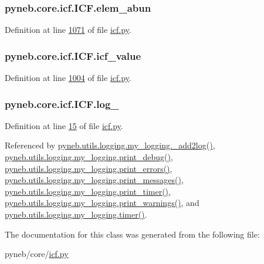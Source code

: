 \hypertarget{classpyneb_1_1core_1_1icf_1_1_i_c_f_a59ea6760bd6a09a66dc47b47bcec55c0}{}
\subsubsection[{elem\+\_\+abun}]{\setlength{\rightskip}{0pt plus 5cm}pyneb.\+core.\+icf.\+I\+C\+F.\+elem\+\_\+abun}\label{classpyneb_1_1core_1_1icf_1_1_i_c_f_a59ea6760bd6a09a66dc47b47bcec55c0}


Definition at line \hyperlink{icf_8py_source_l01071}{1071} of file \hyperlink{icf_8py_source}{icf.\+py}.

\hypertarget{classpyneb_1_1core_1_1icf_1_1_i_c_f_a9dedc0eb2ad90ea08b8be9984e2d832b}{}
\subsubsection[{icf\+\_\+value}]{\setlength{\rightskip}{0pt plus 5cm}pyneb.\+core.\+icf.\+I\+C\+F.\+icf\+\_\+value}\label{classpyneb_1_1core_1_1icf_1_1_i_c_f_a9dedc0eb2ad90ea08b8be9984e2d832b}


Definition at line \hyperlink{icf_8py_source_l01004}{1004} of file \hyperlink{icf_8py_source}{icf.\+py}.

\hypertarget{classpyneb_1_1core_1_1icf_1_1_i_c_f_a50ae74d7192ec52a1249a675f963461e}{}
\subsubsection[{log\+\_\+}]{\setlength{\rightskip}{0pt plus 5cm}pyneb.\+core.\+icf.\+I\+C\+F.\+log\+\_\+}\label{classpyneb_1_1core_1_1icf_1_1_i_c_f_a50ae74d7192ec52a1249a675f963461e}


Definition at line \hyperlink{icf_8py_source_l00015}{15} of file \hyperlink{icf_8py_source}{icf.\+py}.



Referenced by \hyperlink{logging_8py_source_l00059}{pyneb.\+utils.\+logging.\+my\+\_\+logging.\+\_\+add2log()}, \hyperlink{logging_8py_source_l00157}{pyneb.\+utils.\+logging.\+my\+\_\+logging.\+print\+\_\+debug()}, \hyperlink{logging_8py_source_l00149}{pyneb.\+utils.\+logging.\+my\+\_\+logging.\+print\+\_\+errors()}, \hyperlink{logging_8py_source_l00133}{pyneb.\+utils.\+logging.\+my\+\_\+logging.\+print\+\_\+messages()}, \hyperlink{logging_8py_source_l00165}{pyneb.\+utils.\+logging.\+my\+\_\+logging.\+print\+\_\+timer()}, \hyperlink{logging_8py_source_l00141}{pyneb.\+utils.\+logging.\+my\+\_\+logging.\+print\+\_\+warnings()}, and \hyperlink{logging_8py_source_l00115}{pyneb.\+utils.\+logging.\+my\+\_\+logging.\+timer()}.



The documentation for this class was generated from the following file\+:\begin{DoxyCompactItemize}
\item 
pyneb/core/\hyperlink{icf_8py}{icf.\+py}\end{DoxyCompactItemize}
